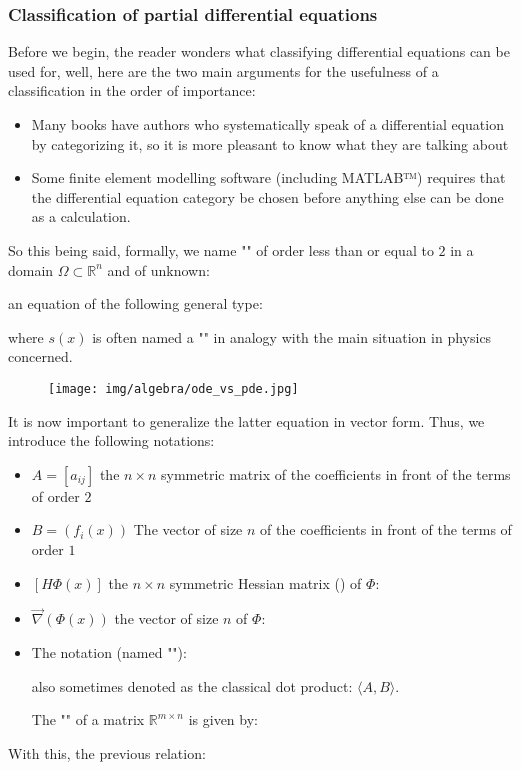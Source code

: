 	\subsubsection{Classification of partial differential equations}
	Before we begin, the reader wonders what classifying differential equations can be used for, well, here are the two main arguments for the usefulness of a classification in the order of importance:
	\begin{itemize}
		\item Many books have authors who systematically speak of a differential equation by categorizing it, so it is more pleasant to know what they are talking about

		\item Some finite element modelling software (including MATLAB™) requires that the differential equation category be chosen before anything else can be done as a calculation.
	\end{itemize}
	So this being said, formally, we name "" of order less than or equal to $2$ in a domain $\Omega \subset \mathbb{R}^n$ and of unknown:
	
	an equation of the following general type:
	
 	where $s(x)$ is often named a "" in analogy with the main situation in physics concerned.
	\begin{figure}[H]
		\centering
		\texttt{[image: img/algebra/ode\_vs\_pde.jpg]}
	\end{figure}
	It is now important to generalize the latter equation in vector form. Thus, we introduce the following notations:
	\begin{itemize}
		\item $A=[a_{ij}]$ the $n\times n$ symmetric matrix of the coefficients in front of the terms of order $2$

		\item $B=(f_i(x))$ The vector of size $n$ of the coefficients in front of the terms of order $1$

		\item $[H\Phi(x)]$ the $n\times n$ symmetric Hessian matrix () of $\Phi$:
		

		\item $\vec{\nabla}(\Phi(x))$ the vector of size $n$ of $\Phi$:
		

		\item The notation (named ""):
		
		also sometimes denoted as the classical dot product: $\langle A,B\rangle$.
		\begin{tcolorbox}[title=Remark,colframe=black,arc=10pt]
		The "" of a matrix $\mathbb{R}^{m\times n}$ is given by:
		
		\end{tcolorbox}
	\end{itemize}
	With this, the previous relation:
	
